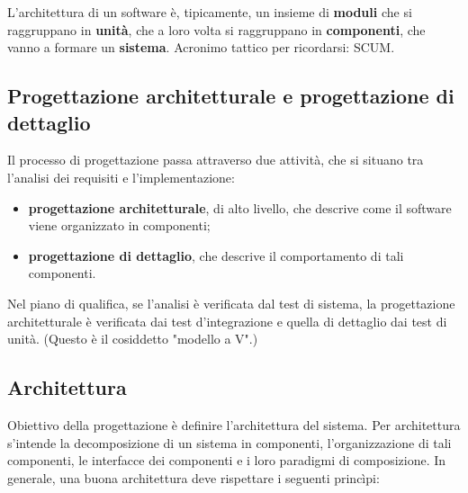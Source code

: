 \documentclass[a4paper]{article}
\begin{document}
L'architettura di un software è, tipicamente, un insieme di \textbf{moduli} che si raggruppano in \textbf{unità}, che a loro volta si raggruppano in \textbf{componenti}, che vanno a formare un \textbf{sistema}. Acronimo tattico per ricordarsi: SCUM.

		
	\subsection{Progettazione architetturale e progettazione di dettaglio}

		
Il processo di progettazione passa attraverso due attività, che si situano tra l'analisi dei requisiti e l'implementazione:
		
	\begin{itemize}
		
			
	\item \textbf{progettazione architetturale}, di alto livello, che descrive come il software viene organizzato in componenti;
			
	\item \textbf{progettazione di dettaglio}, che descrive il comportamento di tali componenti.
		
	\end{itemize}

		
Nel piano di qualifica, se l'analisi è verificata dal test di sistema, la progettazione architetturale è verificata dai test d'integrazione e quella di dettaglio dai test di unità. (Questo è il cosiddetto "modello a V".)

		
	\subsection{Architettura}

		
Obiettivo della progettazione è definire l'architettura del sistema. Per architettura s'intende la decomposizione di un sistema in componenti, l'organizzazione di tali componenti, le interfacce dei componenti e i loro paradigmi di composizione. In generale, una buona architettura deve rispettare i seguenti princìpi:
		
\end{document}
